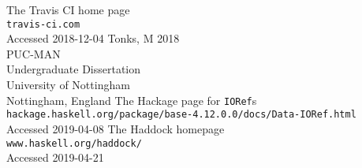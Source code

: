 \documentclass[12pt, a4paper]{report}
\begin{document}
\begin{thebibliography}{0}
    The Travis CI home page\\
    \verb|travis-ci.com|\\
    Accessed 2018-12-04
    Tonks, M 2018\\
    PUC-MAN\\
    Undergraduate Dissertation\\
    University of Nottingham\\
    Nottingham, England
    The Hackage page for \verb|IORef|s\\
    \verb|hackage.haskell.org/package/base-4.12.0.0/docs/Data-IORef.html|\\
    Accessed 2019-04-08
    The Haddock homepage\\
    \verb|www.haskell.org/haddock/|\\
    Accessed 2019-04-21
\end{thebibliography}
\end{document}
